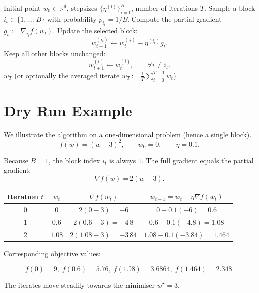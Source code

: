 \documentclass[11pt]{article}
\begin{document}
\begin{algorithm}[H]
\caption{Randomized Block Coordinate Descent (RBCD)}
\label{alg:RBCD}
\begin{algorithmic}[1]
\REQUIRE Initial point $w_0\in\mathbb{R}^d$, stepsizes $\{\eta^{(i)}\}_{i=1}^B$, 
number of iterations $T$.
    \STATE Sample a block $i_t\in\{1,\dots ,B\}$ with probability $p_{i_t}=1/B$.
    \STATE Compute the partial gradient $\displaystyle g_t:=\nabla_{i_t}f(w_t)$.
    \STATE Update the selected block:
    \[
    w_{t+1}^{(i_t)} \gets w_{t}^{(i_t)}-\eta^{(i_t)} g_t .
    \]
    \STATE Keep all other blocks unchanged:
    \[
    w_{t+1}^{(i)} \gets w_{t}^{(i)},\qquad\forall i\neq i_t .
    \]
\ENDFOR
\RETURN $w_T$ (or optionally the averaged iterate $\bar w_T:=\frac1T\sum_{t=0}^{T-1}w_t$).
\end{algorithmic}
\end{algorithm}

\section{Dry Run Example}

We illustrate the algorithm on a one‑dimensional problem (hence a single
block).  
\[
f(w)=(w-3)^2,\qquad w_0=0,\qquad \eta=0.1 .
\]

Because $B=1$, the block index $i_t$ is always $1$.  
The full gradient equals the partial gradient:
\[
\nabla f(w)=2(w-3).
\]

\begin{center}
\begin{tabular}{c|c|c|c}
Iteration $t$ & $w_t$ & $\nabla f(w_t)$ & $w_{t+1}=w_t-\eta\nabla f(w_t)$\\\hline
0 & $0$ & $2(0-3)=-6$ & $0-0.1(-6)=0.6$\\
1 & $0.6$ & $2(0.6-3)=-4.8$ & $0.6-0.1(-4.8)=1.08$\\
2 & $1.08$ & $2(1.08-3)=-3.84$ & $1.08-0.1(-3.84)=1.464$\\\hline
\end{tabular}
\end{center}

Corresponding objective values:

\[
f(0)=9,\; f(0.6)=5.76,\; f(1.08)=3.6864,\; f(1.464)=2.348.
\]

The iterates move steadily towards the minimiser $w^\star=3$.
\end{document}
